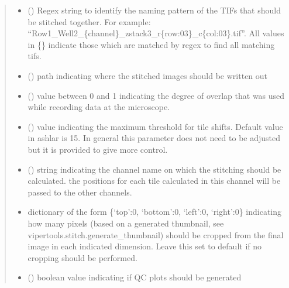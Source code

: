 \documentclass[a4paper,10pt,english,openany,oneside]{sphinxmanual}
\begin{document}
\begin{fulllineitems}
\begin{quote}
\begin{description}
\begin{itemize}
\item {} 
\sphinxAtStartPar
{} () \textendash{} Regex string to identify the naming pattern of the TIFs that should be stitched together.
For example: “Row1\_Well2\_\{channel\}\_zstack3\_r\{row:03\}\_c\{col:03\}.tif”.
All values in \{\} indicate those which are matched by regex to find all matching tifs.

\item {} 
\sphinxAtStartPar
{} () \textendash{} path indicating where the stitched images should be written out

\item {} 
\sphinxAtStartPar
{} () \textendash{} value between 0 and 1 indicating the degree of overlap that was used while recording data at the microscope.

\item {} 
\sphinxAtStartPar
{} () \textendash{} value indicating the maximum threshold for tile shifts. Default value in ashlar is 15. In general this parameter does not need to be adjusted but it is provided
to give more control.

\item {} 
\sphinxAtStartPar
{} () \textendash{} string indicating the channel name on which the stitching should be calculated. the positions for each tile calculated in this channel will be
passed to the other channels.

\item {} 
\sphinxAtStartPar
{} \textendash{} dictionary of the form \{‘top’:0, ‘bottom’:0, ‘left’:0, ‘right’:0\} indicating how many pixels (based on a generated thumbnail,
see vipertools.stitch.generate\_thumbnail) should be cropped from the final image in each indicated dimension. Leave this set to default
if no cropping should be performed.

\item {} 
\sphinxAtStartPar
{} () \textendash{} boolean value indicating if QC plots should be generated


\end{itemize}
\end{description}
\end{quote}
\end{fulllineitems}
\end{document}
